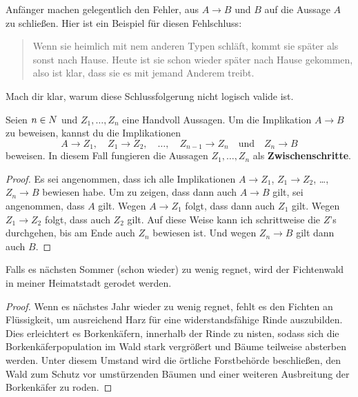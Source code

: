 \begin{bem}
    Anfänger machen gelegentlich den Fehler, aus $A\to B$ und $B$ auf die Aussage $A$ zu schließen. Hier ist ein Beispiel für diesen Fehlschluss:
    \begin{quote}
        Wenn sie heimlich mit nem anderen Typen schläft, kommt sie später als sonst nach Hause. Heute ist sie schon wieder später nach Hause gekommen, also ist klar, dass sie es mit jemand Anderem treibt.
    \end{quote}
    Mach dir klar, warum diese Schlussfolgerung nicht logisch valide ist.
\end{bem}


\begin{satz} \label{implikationtrans}
    Seien $n\in \relax N$ und $Z_1,\dots , Z_n$ eine Handvoll Aussagen. Um die Implikation $A\to B$ zu beweisen, kannst du die Implikationen
        \[ A\to Z_1,\quad Z_1\to Z_2,\quad \dots ,\quad Z_{n-1}\to Z_n\quad \text{und}\quad Z_n\to B \]
    beweisen. In diesem Fall fungieren die Aussagen $Z_1,\dots , Z_n$ als \textbf{Zwischenschritte}.
\end{satz}
\begin{proof}
    Es sei angenommen, dass ich alle Implikationen $A\to Z_1$, $Z_1\to Z_2$, \dots , $Z_n\to B$ bewiesen habe. Um zu zeigen, dass dann auch $A\to B$ gilt, sei angenommen, dass $A$ gilt. Wegen $A\to Z_1$ folgt, dass dann auch $Z_1$ gilt. Wegen $Z_1\to Z_2$ folgt, dass auch $Z_2$ gilt. Auf diese Weise kann ich schrittweise die $Z$'s durchgehen, bis am Ende auch $Z_n$ bewiesen ist. Und wegen $Z_n\to B$ gilt dann auch $B$.
\end{proof}


\begin{bsp}
    Falls es nächsten Sommer (schon wieder) zu wenig regnet, wird der Fichtenwald in meiner Heimatstadt gerodet werden.
\end{bsp}
\begin{proof}
    Wenn es nächstes Jahr wieder zu wenig regnet, fehlt es den Fichten an Flüssigkeit, um ausreichend Harz für eine widerstandsfähige Rinde auszubilden. Dies erleichtert es Borkenkäfern, innerhalb der Rinde zu nisten, sodass sich die Borkenkäferpopulation im Wald stark vergrößert und Bäume teilweise absterben werden. Unter diesem Umstand wird die örtliche Forstbehörde beschließen, den Wald zum Schutz vor umstürzenden Bäumen und einer weiteren Ausbreitung der Borkenkäfer zu roden.
\end{proof}





